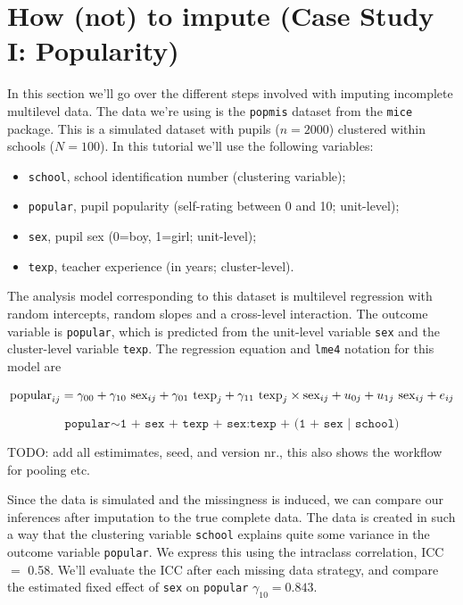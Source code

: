 \documentclass[
]{jss}
\providecommand{\tightlist}{%
  \setlength{\itemsep}{0pt}\setlength{\parskip}{0pt}}
\begin{document}
\hypertarget{how-not-to-impute-case-study-i-popularity}{%
\section{How (not) to impute (Case Study I:
Popularity)}\label{how-not-to-impute-case-study-i-popularity}}

In this section we'll go over the different steps involved with imputing
incomplete multilevel data. The data we're using is the \texttt{popmis}
dataset from the \texttt{mice} package. This is a simulated dataset with
pupils (\(n = 2000\)) clustered within schools (\(N = 100\)). In this
tutorial we'll use the following variables:

\begin{itemize}
\tightlist
\item
  \texttt{school}, school identification number (clustering variable);
\item
  \texttt{popular}, pupil popularity (self-rating between 0 and 10;
  unit-level);
\item
  \texttt{sex}, pupil sex (0=boy, 1=girl; unit-level);
\item
  \texttt{texp}, teacher experience (in years; cluster-level).
\end{itemize}

The analysis model corresponding to this dataset is multilevel
regression with random intercepts, random slopes and a cross-level
interaction. The outcome variable is \texttt{popular}, which is
predicted from the unit-level variable \texttt{sex} and the
cluster-level variable \texttt{texp}. The regression equation and
\texttt{lme4} notation for this model are

\[
\text{popular}_{ij} =
\gamma_{00} + 
\gamma_{10} \text{ sex}_{ij} + 
\gamma_{01} \text{ texp}_{j} + 
\gamma_{11} \text{ texp}_{j} \times \text{sex}_{ij} + 
u_{0j} + 
u_{1j} \text{ sex}_{ij} + 
e_{ij} \\
\]

\[
\texttt{popular} \sim  \texttt{1 + sex + texp + sex:texp + (1 + sex | school)}
\]

TODO: add all estimimates, seed, and version nr., this also shows the
workflow for pooling etc.

Since the data is simulated and the missingness is induced, we can
compare our inferences after imputation to the true complete data. The
data is created in such a way that the clustering variable
\texttt{school} explains quite some variance in the outcome variable
\texttt{popular}. We express this using the intraclass correlation, ICC
\(=\) 0.58. We'll evaluate the ICC after each missing data strategy, and
compare the estimated fixed effect of \texttt{sex} on \texttt{popular}
\(\gamma_{10} = 0.843\).
\end{document}
